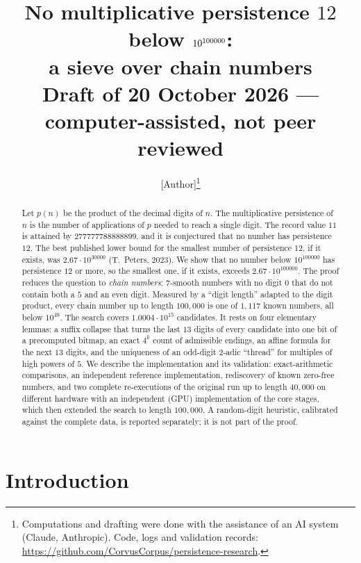 \documentclass[11pt]{article}
\title{No multiplicative persistence $12$ below $10^{\NBexp}$:\\ a sieve over chain numbers\\[4pt]
\large Draft of 20 October 2026 --- computer-assisted, not peer reviewed}
\author{[Author]\thanks{Computations and drafting were done with the assistance of an AI system (Claude, Anthropic).
Code, logs and validation records: \url{https://github.com/CorvusCorpus/persistence-research}.}}
\date{}
\theoremstyle{definition}
\newcommand{\NB}{100{,}000}
\newcommand{\NBexp}{100000}
\newcommand{\ncand}{1.0004\cdot 10^{15}}
\begin{document}
\maketitle

\begin{abstract}
Let $p(n)$ be the product of the decimal digits of $n$. The multiplicative persistence of $n$ is the number of
applications of $p$ needed to reach a single digit. The record value $11$ is attained by $277777788888899$, and it is
conjectured that no number has persistence $12$. The best published lower bound for the smallest number of
persistence $12$, if it exists, was $2.67\cdot 10^{30000}$ (T.~Peters, 2023). We show that no number below
$10^{\NBexp}$ has persistence $12$ or more, so the smallest one, if it exists, exceeds $2.67\cdot 10^{\NBexp}$. The
proof reduces the question to \emph{chain numbers}: $7$-smooth numbers with no digit $0$ that do not contain both a $5$
and an even digit. Measured by a ``digit length'' adapted to the digit product, every chain number up to length
$\NB$ is one of $1{,}117$ known numbers, all below $10^{49}$. The search covers $\ncand$ candidates. It rests on four
elementary lemmas: a suffix collapse that turns the last $13$ digits of every candidate into one bit of a precomputed
bitmap, an exact $4^k$ count of admissible endings, an affine formula for the next $13$ digits, and the uniqueness of
an odd-digit $2$-adic ``thread'' for multiples of high powers of $5$. We describe the implementation and its
validation: exact-arithmetic comparisons, an independent reference implementation, rediscovery of known zero-free
numbers, and two complete re-executions of the original run up to length $40{,}000$ on different hardware with an
independent (GPU) implementation of the core stages, which then extended the search to length $\NB$.
A random-digit heuristic, calibrated against the complete data, is reported separately; it is not part of the proof.
\end{abstract}

\section{Introduction}
\end{document}
